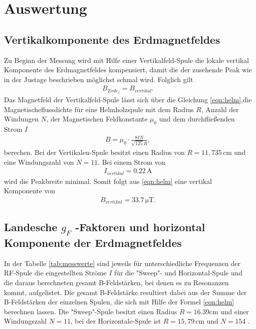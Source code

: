 \section{Auswertung}
\label{sec:Auswertung}
\subsection{Vertikalkomponente des Erdmagnetfeldes}
Zu Beginn der Messung wird mit Hilfe einer Vertikalfeld-Spule
die lokale vertikal Komponente des Erdmagnetfeldes kompensiert, damit
 die der zusehende Peak
wie in der Justage beschrieben möglichst schmal wird. Folglich
gilt
\begin{align*}
B_{Erde_z}=B_{vertikal}.
\end{align*}
Das Magnetfeld der Vertikalfeld-Spule lässt sich über die Gleichung
\eqref{eqn:helm},die Magnetischeflussdichte für eine Helmholzspule mit dem Radius $R$,
Anzahl der Windungen $N$, der Magnetischen Feldkonstante $\mu_0$ und dem durchfließenden Strom $I$
\begin{align}
B=\mu_0 \cdot \frac{8 I N}{\sqrt{125} R}, \label{eqn:helm}
\end{align}
berechen. Bei der Vertikalen-Spule besitzt einen Radius von $R=11,735\,\si{\centi\meter} $
und eine Windungszahl von $N=11$.
Bei einem Strom von
\begin{align*}
  I_{vertikal}=0.22 \,\si{\ampere}
\end{align*}
wird die Peakbreite minimal. Somit folgt aus \eqref{eqn:helm}
eine  vertikal Komponente von
\begin{align*}
  B_{vertikal}=33.7\,\si{\micro\tesla}.
\end{align*}



\subsection{Landesche $g_F$ -Faktoren und horizontal Komponente der Erdmagnetfeldes}
In der Tabelle \ref{tab:messwerte} sind jeweils
für  unterschiedliche Frequenzen der RF-Spule
die eingestellten Ströme $I$ für die "Sweep"- und Horizontal-Spule
und die daraus
berechneten gesamt B-Feldstärken,
bei denen es zu Resonanzen kommt, aufgelistet.
Die gesamt B-Feldstärke resultiert dabei aus
der Summe der B-Feldstärken der
einzelnen Spulen, die sich mit Hilfe der Formel \eqref{eqn:helm}
berechnen lassen.
Die "Sweep"-Spule besitzt einen Radius  $R=16.39\si{\centi\meter}$
und einer Windungszahl $N=11$, bei der Horizontale-Spule ist $R=15,79\,\si{\centi\meter}$
 und $N=154$ .

